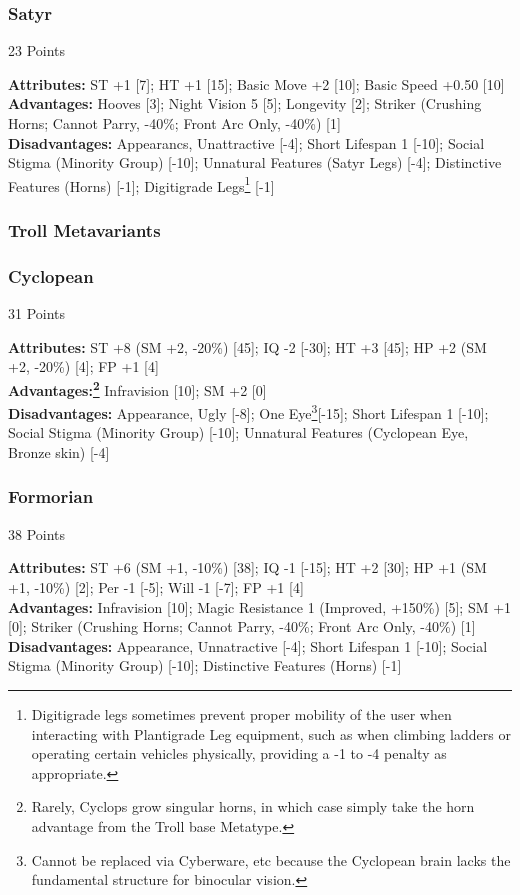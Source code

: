 \begin{multicols*}{3}
	\subsubsection*{Satyr}
	\begin{flushright}
		23 Points
	\end{flushright}
	\textbf{Attributes:} 
	ST +1 [7]; HT +1 [15]; Basic Move +2 [10]; Basic Speed +0.50 [10]
	\\\textbf{Advantages:} 
	Hooves [3]; Night Vision 5 [5]; Longevity [2]; Striker (Crushing Horns; Cannot Parry, -40\%; Front Arc Only, -40\%) [1]
	\\\textbf{Disadvantages:} 
	Appearancs, Unattractive [-4]; Short Lifespan 1 [-10]; Social Stigma (Minority Group) [-10]; Unnatural Features (Satyr Legs) [-4]; Distinctive Features (Horns) [-1]; Digitigrade Legs\footnote{Digitigrade legs sometimes prevent proper mobility of the user when interacting with Plantigrade Leg equipment, such as when climbing ladders or operating certain vehicles physically, providing a -1 to -4 penalty as appropriate.} [-1]
	
	\subsubsection{Troll Metavariants}
	
	\subsubsection*{Cyclopean}
	\begin{flushright}
		31 Points
	\end{flushright}
	\textbf{Attributes:} 
	ST +8 (SM +2, -20\%) [45]; IQ -2 [-30]; HT +3 [45]; HP +2 (SM +2, -20\%) [4]; FP +1 [4]
	\\\textbf{Advantages:\footnote{Rarely, Cyclops grow singular horns, in which case simply take the horn advantage from the Troll base Metatype.}} 
	Infravision [10]; SM +2 [0]
	\\\textbf{Disadvantages:} 
	Appearance, Ugly [-8]; One Eye\footnote{Cannot be replaced via  Cyberware, etc because the Cyclopean brain lacks the fundamental structure for binocular vision.}[-15]; Short Lifespan 1 [-10]; Social Stigma (Minority Group) [-10]; Unnatural Features (Cyclopean Eye, Bronze skin) [-4]
	
	\subsubsection*{Formorian}
	\begin{flushright}
		38 Points
	\end{flushright}
	\textbf{Attributes:} 
	ST +6 (SM +1, -10\%) [38]; IQ -1 [-15]; HT +2 [30]; HP +1 (SM +1, -10\%) [2]; Per -1 [-5]; Will -1 [-7]; FP +1 [4]
	\\\textbf{Advantages:} 
	Infravision [10]; Magic Resistance 1 (Improved, +150\%)  [5]; SM +1 [0]; Striker (Crushing Horns; Cannot Parry, -40\%; Front Arc Only, -40\%) [1]
	\\\textbf{Disadvantages:} 
	Appearance, Unnatractive [-4]; Short Lifespan 1 [-10]; Social Stigma (Minority Group) [-10]; Distinctive Features (Horns) [-1]
	

\end{multicols*}
